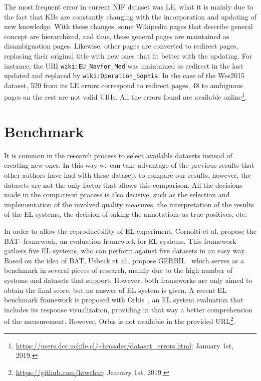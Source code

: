 \documentclass[sigconf]{acmart}
\begin{document}
The most frequent error in current NIF dataset was LE, what it is mainly due to the fact that KBs are constantly changing with the incorporation and updating of new knowledge. With these changes, some Wikipedia pages that describe general concept are hierarchized, and thus, these general pages are maintained as disambiguation pages. Likewise, other pages are converted to redirect pages, replacing their original title with new ones that fit better with the updating. For instance, the URI \texttt{wiki:EU\_Navfor\_Med} was maintained as redirect in the last updated and replaced by \texttt{wiki:Operation\_Sophia}. In the case of the Wes2015 dataset, 520 from its LE errors correspond to redirect pages, 48 to ambiguous pages an the rest are not valid URIs. All the errors found are available online\footnote{\url{https://users.dcc.uchile.cl/~hrosales/dataset_errors.html}; January 1st, 2019.}.
\section{Benchmark}

It is common in the research process to select available datasets instead of creating new ones. In this way we can take advantage of the previous results that other authors have had with these datasets to compare our results, however, the datasets are not the only factor that allows this comparison. All the decisions made in the comparison process is also decisive, such as the selection and implementation of the involved quality measures, the interpretation of the results of the EL systems, the decision of taking the annotations as true positives, etc.

In order to allow the reproducibility of EL experiment, Cornolti et al.\cite{BAT2013} propose the BAT- framework, an evaluation framework for EL systems.  This framework gathers five EL systems, who can perform against five datasets in an easy way. Based on the idea of BAT, Usbeck et al., propose GERBIL~\cite{gerbil-2015} which serves as a benchmark in several pieces of research, mainly due to the high number of systems and datasets that support. However, both frameworks are only aimed to obtain the final score, but no answer of EL system is given. A recent EL benchmark framework is proposed with Orbis~\cite{Orbis2018}, an EL system evaluation that includes its response visualization, providing in that way a better comprehension of the measurement. However, Orbis is not available in the provided URL\footnote{\url{https://github.com/htwchur}; January 1st, 2019.}. 
\end{document}
